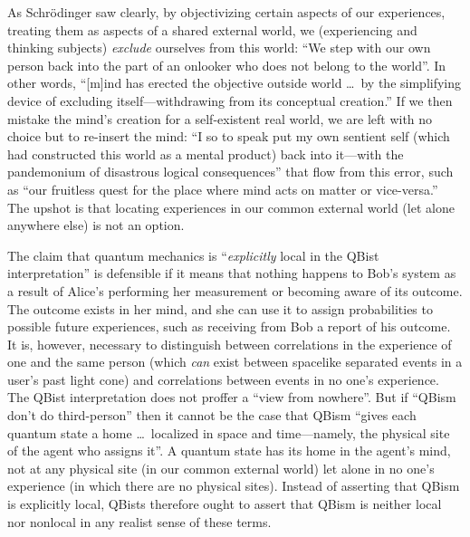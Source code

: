 \documentclass[smallextended]{svjour3}
\begin{document}
As Schr\"odinger saw clearly, by objectivizing certain aspects of our experiences, treating them as aspects of a shared {external world}, we (experiencing and thinking subjects) \emph{exclude} ourselves from this world: ``We step with our own person back into the part of an onlooker who does not belong to the world''.\cite{SchrLifeMindMatter3} In other words, ``[m]ind has erected the objective outside world \dots\ by the simplifying device of excluding itself---withdrawing from its conceptual creation.'' If we then mistake the mind's creation for a self-existent real world, we are left with no choice but to re-insert the mind: ``I so to speak put my own sentient self (which had constructed this world as a mental product) back into it---with the {pandemonium} of disastrous logical consequences'' that flow from this error, such as ``our fruitless quest for the place where mind acts on matter or vice-versa.'' The upshot is that locating experiences in our common external world (let alone anywhere else) is not an option.

The claim that quantum mechanics is ``\emph{explicitly} local in the QBist inter\-pretation''\cite{FMS2014} is defensible if it means that nothing happens to Bob's system as a result of Alice's performing her measurement or becoming aware of its outcome. The outcome exists in her mind, and she can use it to assign probabilities to possible future experiences, such as receiving from Bob a report of his outcome. It is, however, necessary to distinguish between correlations in the experience of one and the same person (which \emph{can} exist between spacelike separated events in a user's past light cone) and correlations between events in no one's experience. The QBist interpretation does not proffer a ``{view from nowhere}''.\cite{Nagel_Nowhere} But if ``QBism don't do third-person''\cite{Fuchs_Notwithstanding} then it cannot be the case that QBism ``gives each {quantum state} a home \dots\ localized in space and time---namely, the physical site of the agent who assigns it''.\cite{Fuchs_Perimeter} A quantum state has its home in the agent's mind, not at any physical site (in our common external world) let alone in no one's experience (in which there are no physical sites). Instead of asserting that QBism is explicitly local, QBists therefore ought to assert that QBism is neither local nor nonlocal in any realist sense of these terms.
\end{document}
